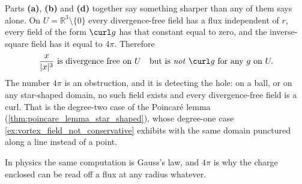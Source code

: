 \begin{exercisesolution}
\begin{remark}
Parts \textbf{(a)}, \textbf{(b)} and \textbf{(d)} together say something sharper than any of them
says alone. On $U = \mathbb{R}^3\setminus\{0\}$ every divergence-free field has a flux
independent of $r$, every field of the form $\curl g$ has that constant equal to zero, and the
inverse-square field has it equal to $4\pi$. Therefore
\[\frac{x}{\lvert x\rvert^3} \text{ is divergence free on } U
  \quad\text{but is \emph{not} } \curl g \text{ for any } g \text{ on } U .\]
The number $4\pi$ is an obstruction, and it is detecting the hole: on a ball, or on any
star-shaped domain, no such field exists and every divergence-free field is a curl. That is the
degree-two case of the Poincar\'e lemma (\cref{thm:poincare_lemma_star_shaped}), whose degree-one case
\cref{ex:vortex_field_not_conservative} exhibits with the same domain punctured along a line
instead of a point.

In physics the same computation is Gauss's law, and $4\pi$ is why the charge enclosed can be read
off a flux at any radius whatever.
\end{remark}
\end{exercisesolution}



